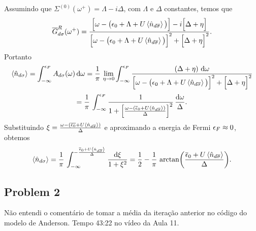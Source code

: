 \documentclass[a4paper,fleqn,12pt]{article}
\begin{document}
Assumindo que $\Sigma^{(0)}(\omega^+) = \Lambda - i \Delta$, com $\Lambda$ e $\Delta$ constantes, temos que
$$
\cc{G}_{d\sigma}^R(\omega^+) =
\frac{\Big[\omega - \big(\eps_0 + \Lambda + U \ev{\nn_{d\cc{\sigma}}}\big) \Big] - i \Big[ \Delta + \eta \Big]}{\Big[\omega - \big(\eps_0 + \Lambda + U \ev{\nn_{d\cc{\sigma}}}\big) \Big]^2 + \Big[ \Delta + \eta \Big]^2}.
$$
Portanto
$$
\ev{\nn_{d\sigma}} = \int_{-\infty}^{\eps_F} A_{d\sigma}(\omega) \dd{\omega} = \frac{1}{\pi} \, \lim_{\eta \to 0} \int_{-\infty}^{\eps_F}
\frac{(\Delta + \eta) \, \dd{\omega}}{\Big[\omega - \big(\eps_0 + \Lambda + U \ev{\nn_{d\cc{\sigma}}}\big) \Big]^2 + \Big[ \Delta + \eta \Big]^2}
$$
$$
= \frac{1}{\pi} \, \int_{-\infty}^{\eps_F} \frac{1}{1 + \qty[\frac{\omega - (\cc{\eps}_0 + U \ev{\nn_{d\cc{\sigma}}})}{\Delta}]^2} \, \frac{\dd{\omega}}{\Delta}.
$$
Substituindo $\xi = \frac{\omega - (\cc{\eps_0} + U \ev{\nn_{d\cc{\sigma}}})}{\Delta}$ e aproximando a energia de Fermi $\epsilon_F \approx 0$, obtemos
$$
\ev{\nn_{d\sigma}} = \frac{1}{\pi} \, \int_{-\infty}^{-\frac{\cc{\eps}_0 + U \ev{\nn_{d\cc{\sigma}}}}{\Delta}} \frac{\dd{\xi}}{1 + \xi^2} =
\frac{1}{2} - \frac{1}{\pi} \, \arctan(\frac{\cc{\eps}_0 + U \ev{\nn_{d\cc{\sigma}}}}{\Delta}).
$$

\subsection{Problem 2}

Não entendi o comentário de tomar a média da iteração anterior no código do modelo de Anderson. Tempo 43:22 no vídeo da Aula 11.

\n\n\n\n
\end{document}

